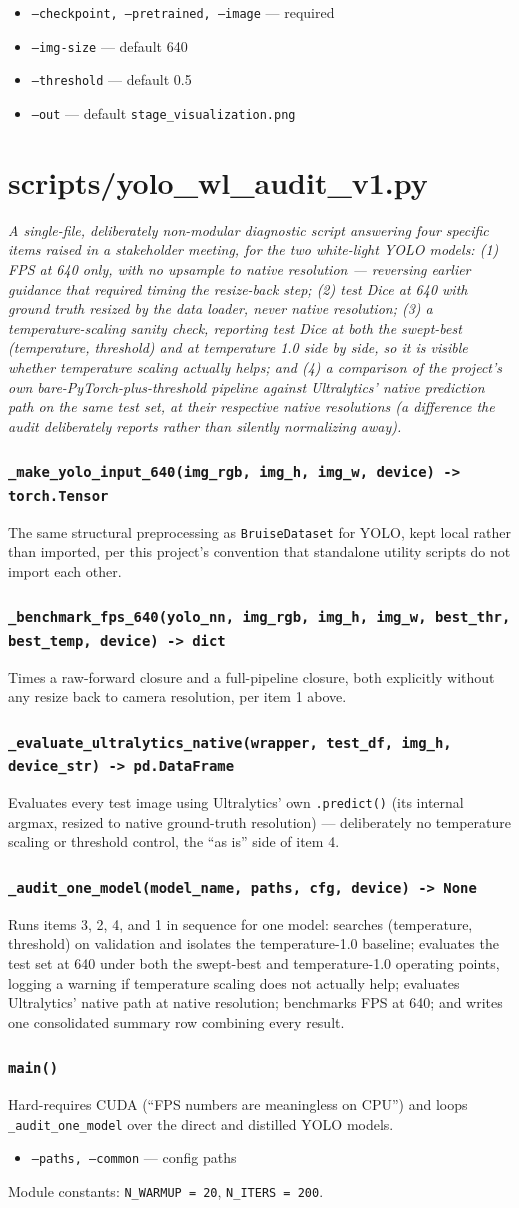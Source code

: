 \documentclass[11pt]{article}
\newcommand{\role}[1]{\par\noindent\textit{#1}\par\vspace{0.5em}}
\newcommand{\func}[1]{\subsubsection*{\texttt{#1}}}
\newcommand{\cliarg}[2]{\item \texttt{#1} --- #2}
\begin{document}
\begin{itemize}[nosep]
\cliarg{--checkpoint, --pretrained, --image}{required}
\cliarg{--img-size}{default 640}
\cliarg{--threshold}{default 0.5}
\cliarg{--out}{default \texttt{stage\_visualization.png}}
\end{itemize}

\section{scripts/yolo\_wl\_audit\_v1.py}
\role{A single-file, deliberately non-modular diagnostic script answering four
specific items raised in a stakeholder meeting, for the two white-light YOLO
models: (1) FPS at 640 only, with no upsample to native resolution --- reversing
earlier guidance that required timing the resize-back step; (2) test Dice at
640 with ground truth resized by the data loader, never native resolution;
(3) a temperature-scaling sanity check, reporting test Dice at both the
swept-best (temperature, threshold) and at temperature 1.0 side by side, so it
is visible whether temperature scaling actually helps; and (4) a comparison of
the project's own bare-PyTorch-plus-threshold pipeline against Ultralytics'
native prediction path on the same test set, at their respective native
resolutions (a difference the audit deliberately reports rather than silently
normalizing away).}

\func{\_make\_yolo\_input\_640(img\_rgb, img\_h, img\_w, device) -> torch.Tensor}
The same structural preprocessing as \texttt{BruiseDataset} for YOLO, kept
local rather than imported, per this project's convention that standalone
utility scripts do not import each other.

\func{\_benchmark\_fps\_640(yolo\_nn, img\_rgb, img\_h, img\_w, best\_thr, best\_temp, device) -> dict}
Times a raw-forward closure and a full-pipeline closure, both explicitly
without any resize back to camera resolution, per item 1 above.

\func{\_evaluate\_ultralytics\_native(wrapper, test\_df, img\_h, device\_str) -> pd.DataFrame}
Evaluates every test image using Ultralytics' own \texttt{.predict()} (its
internal argmax, resized to native ground-truth resolution) --- deliberately no
temperature scaling or threshold control, the ``as is'' side of item 4.

\func{\_audit\_one\_model(model\_name, paths, cfg, device) -> None}
Runs items 3, 2, 4, and 1 in sequence for one model: searches (temperature,
threshold) on validation and isolates the temperature-1.0 baseline; evaluates
the test set at 640 under both the swept-best and temperature-1.0 operating
points, logging a warning if temperature scaling does not actually help;
evaluates Ultralytics' native path at native resolution; benchmarks FPS at 640;
and writes one consolidated summary row combining every result.

\func{main()}
Hard-requires CUDA (``FPS numbers are meaningless on CPU'') and loops
\texttt{\_audit\_one\_model} over the direct and distilled YOLO models.

\begin{itemize}[nosep]
\cliarg{--paths, --common}{config paths}
\end{itemize}
Module constants: \texttt{N\_WARMUP = 20}, \texttt{N\_ITERS = 200}.
\end{document}
